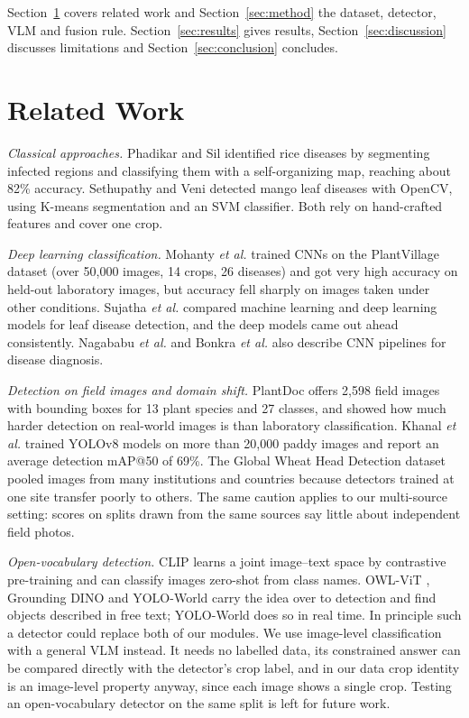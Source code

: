 \documentclass[conference]{IEEEtran}
\begin{document}
Section~\ref{sec:related} covers related work and Section~\ref{sec:method} the dataset, detector, VLM and fusion rule. Section~\ref{sec:results} gives results, Section~\ref{sec:discussion} discusses limitations and Section~\ref{sec:conclusion} concludes.

\section{Related Work}\label{sec:related}

\textit{Classical approaches.} Phadikar and Sil \cite{phadikar2008} identified rice diseases by segmenting infected regions and classifying them with a self-organizing map, reaching about 82\% accuracy. Sethupathy and Veni \cite{sethupathy2016} detected mango leaf diseases with OpenCV, using K-means segmentation and an SVM classifier. Both rely on hand-crafted features and cover one crop.

\textit{Deep learning classification.} Mohanty \textit{et al.} \cite{mohanty2016} trained CNNs on the PlantVillage dataset \cite{hughes2015plantvillage} (over 50,000 images, 14 crops, 26 diseases) and got very high accuracy on held-out laboratory images, but accuracy fell sharply on images taken under other conditions. Sujatha \textit{et al.} \cite{sujatha2025} compared machine learning and deep learning models for leaf disease detection, and the deep models came out ahead consistently. Nagababu \textit{et al.} \cite{nagababu2024} and Bonkra \textit{et al.} \cite{bonkra2023} also describe CNN pipelines for disease diagnosis.

\textit{Detection on field images and domain shift.} PlantDoc \cite{singh2020plantdoc} offers 2,598 field images with bounding boxes for 13 plant species and 27 classes, and showed how much harder detection on real-world images is than laboratory classification. Khanal \textit{et al.} \cite{khanal2024} trained YOLOv8 models on more than 20,000 paddy images and report an average detection mAP@50 of 69\%. The Global Wheat Head Detection dataset \cite{david2020gwhd} pooled images from many institutions and countries because detectors trained at one site transfer poorly to others. The same caution applies to our multi-source setting: scores on splits drawn from the same sources say little about independent field photos.

\textit{Open-vocabulary detection.} CLIP \cite{radford2021clip} learns a joint image--text space by contrastive pre-training and can classify images zero-shot from class names. OWL-ViT \cite{minderer2022owlvit}, Grounding DINO \cite{liu2024groundingdino} and YOLO-World \cite{cheng2024yoloworld} carry the idea over to detection and find objects described in free text; YOLO-World does so in real time. In principle such a detector could replace both of our modules. We use image-level classification with a general VLM instead. It needs no labelled data, its constrained answer can be compared directly with the detector's crop label, and in our data crop identity is an image-level property anyway, since each image shows a single crop. Testing an open-vocabulary detector on the same split is left for future work.
\end{document}

